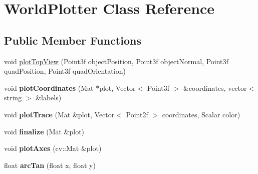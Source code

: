 \hypertarget{classWorldPlotter}{
\section{WorldPlotter Class Reference}
\label{classWorldPlotter}
}
\subsection*{Public Member Functions}
\begin{DoxyCompactItemize}
\item 
void \hyperlink{classWorldPlotter_ab01669f1e5081c172f7c7cddf10c4d09}{plotTopView} (Point3f objectPosition, Point3f objectNormal, Point3f quadPosition, Point3f quadOrientation)
\item 
\hypertarget{classWorldPlotter_a27140f0ab74f79c557e0244ca069fc3a}{
void {\bfseries plotCoordinates} (Mat $\ast$plot, Vector$<$ Point3f $>$ \&coordinates, vector$<$ string $>$ \&labels)}
\label{classWorldPlotter_a27140f0ab74f79c557e0244ca069fc3a}

\item 
\hypertarget{classWorldPlotter_aebac1a731459a26836ed8b7a788153c6}{
void {\bfseries plotTrace} (Mat \&plot, Vector$<$ Point2f $>$ coordinates, Scalar color)}
\label{classWorldPlotter_aebac1a731459a26836ed8b7a788153c6}

\item 
\hypertarget{classWorldPlotter_a7847eb27daf2f2fadcfb510998420e7e}{
void {\bfseries finalize} (Mat \&plot)}
\label{classWorldPlotter_a7847eb27daf2f2fadcfb510998420e7e}

\item 
\hypertarget{classWorldPlotter_a4b9a493bcc6459ff52319b493c9ba10c}{
void {\bfseries plotAxes} (cv::Mat \&plot)}
\label{classWorldPlotter_a4b9a493bcc6459ff52319b493c9ba10c}

\item 
\hypertarget{classWorldPlotter_a35f3db486078ce9097037595cf28a915}{
float {\bfseries arcTan} (float x, float y)}
\label{classWorldPlotter_a35f3db486078ce9097037595cf28a915}

\end{DoxyCompactItemize}
